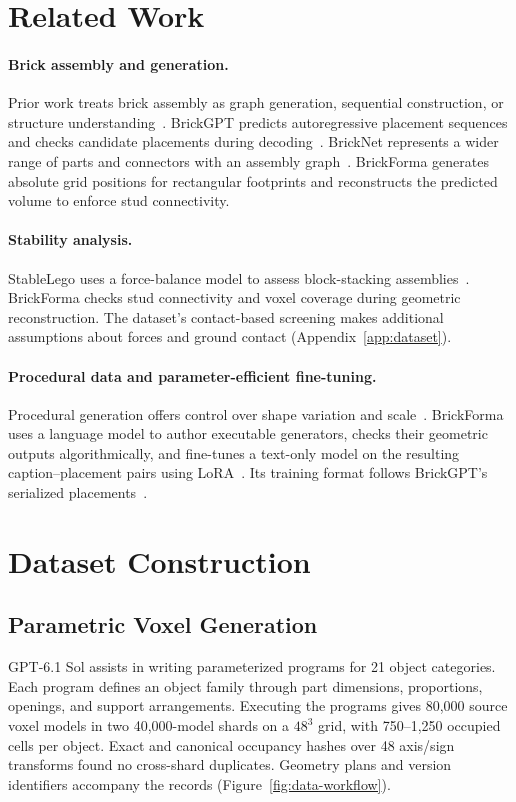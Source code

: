 \section{Related Work}
\paragraph{Brick assembly and generation.}
Prior work treats brick assembly as graph generation, sequential construction, or structure understanding~\cite{thompson2020lego,brickbybrick,breakandmake}. BrickGPT predicts autoregressive placement sequences and checks candidate placements during decoding~\cite{brickgpt}. BrickNet represents a wider range of parts and connectors with an assembly graph~\cite{bricknet}. BrickForma generates absolute grid positions for rectangular footprints and reconstructs the predicted volume to enforce stud connectivity.

\paragraph{Stability analysis.}
StableLego uses a force-balance model to assess block-stacking assemblies~\cite{stablelego}. BrickForma checks stud connectivity and voxel coverage during geometric reconstruction. The dataset's contact-based screening makes additional assumptions about forces and ground contact (Appendix~\ref{app:dataset}).

\paragraph{Procedural data and parameter-efficient fine-tuning.}
Procedural generation offers control over shape variation and scale~\cite{infinigen}. BrickForma uses a language model to author executable generators, checks their geometric outputs algorithmically, and fine-tunes a text-only model on the resulting caption--placement pairs using LoRA~\cite{lora}. Its training format follows BrickGPT's serialized placements~\cite{brickgpt}.

\section{Dataset Construction}
\label{sec:dataset}
\subsection{Parametric Voxel Generation}
GPT-6.1 Sol assists in writing parameterized programs for 21 object categories. Each program defines an object family through part dimensions, proportions, openings, and support arrangements. Executing the programs gives 80,000 source voxel models in two 40,000-model shards on a $48^3$ grid, with 750--1,250 occupied cells per object. Exact and canonical occupancy hashes over 48 axis/sign transforms found no cross-shard duplicates. Geometry plans and version identifiers accompany the records (Figure~\ref{fig:data-workflow}).

